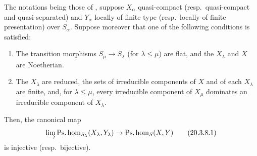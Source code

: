 \begin{proposition}[20.3.8]
\label{IV.20.3.8}
The notations being those of , suppose $X_\alpha$ quasi-compact (resp.\ quasi-compact and quasi-separated) and $Y_\alpha$ locally of finite type (resp.\ locally of finite presentation) over $S_\alpha$.
Suppose moreover that one of the following conditions is satisfied:
\begin{enumerate}[label=\emph{(\roman*)}]
  \item The transition morphisms $S_\mu\to S_\lambda$ (for $\lambda\leq\mu$) are flat, and the $X_\lambda$ and $X$ are Noetherian.
  \item The $X_\lambda$ are reduced, the sets of irreducible components of $X$ and of each $X_\lambda$ are finite, and, for $\lambda\leq\mu$, every irreducible component of $X_\mu$ dominates an irreducible component of $X_\lambda$.
\end{enumerate}
Then, the canonical map
\[
\label{IV.20.3.8.1}
  \varinjlim\operatorname{Ps.hom}_{S_\lambda}(X_\lambda,Y_\lambda)\to\operatorname{Ps.hom}_S(X,Y)
  \tag{20.3.8.1}
\]
is injective (resp.\ bijective).
\end{proposition}

